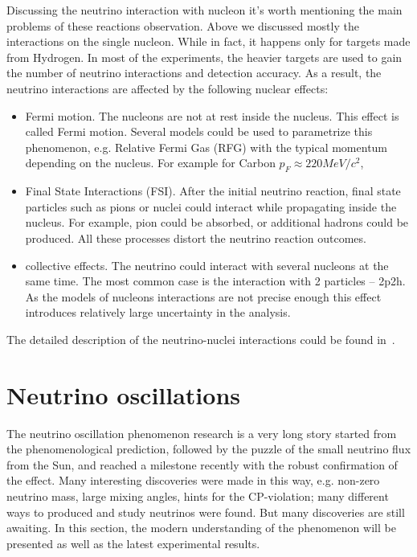 \documentclass[../main.tex]{subfiles}
\begin{document}
Discussing the neutrino interaction with nucleon it's worth mentioning the main problems of these reactions observation. Above we discussed mostly the interactions on the single nucleon. While in fact, it happens only for targets made from Hydrogen. In most of the experiments, the heavier targets are used to gain the number of neutrino interactions and detection accuracy. As a result, the neutrino interactions are affected by the following nuclear effects:
\begin{itemize}
  \item Fermi motion. The nucleons are not at rest inside the nucleus. This effect is called Fermi motion. Several models could be used to parametrize this phenomenon, e.g. Relative Fermi Gas (RFG) with the typical momentum depending on the nucleus. For example for Carbon $p_F\approx 220 MeV/c^2$,
  \item Final State Interactions (FSI). After the initial neutrino reaction, final state particles such as pions or nuclei could interact while propagating inside the nucleus. For example, pion could be absorbed, or additional hadrons could be produced. All these processes distort the neutrino reaction outcomes.
  \item collective effects. The neutrino could interact with several nucleons at the same time. The most common case is the interaction with 2 particles -- 2p2h. As the models of nucleons interactions are not precise enough this effect introduces relatively large uncertainty in the analysis.
\end{itemize}

The detailed description of the neutrino-nuclei interactions could be found in~\cite{formaggio2012ev}.


\section{Neutrino oscillations}
\label{sec:intro:osc}
The neutrino oscillation phenomenon research is a very long story started from the phenomenological prediction, followed by the puzzle of the small neutrino flux from the Sun, and reached a milestone recently with the robust confirmation of the effect. Many interesting discoveries were made in this way, e.g. non-zero neutrino mass, large mixing angles, hints for the CP-violation; many different ways to produced and study neutrinos were found. But many discoveries are still awaiting. In this section, the modern understanding of the phenomenon will be presented as well as the latest experimental results.
\end{document}
